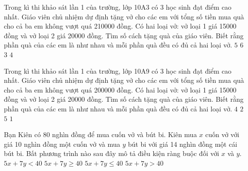 \begin{ex}
 Trong kì thi khảo sát lần 1 của trường, lớp 10A3 có 3 học sinh đạt điểm cao nhất. Giáo viên chủ nhiệm dự định tặng vở cho các em với tổng số tiền mua quà cho cả ba em không vượt quá 210000 đồng. Có hai loại vở: vở loại 1 giá 15000 đồng và vở loại 2 giá 20000 đồng. Tìm số cách tặng quà của giáo viên. Biết rằng phần quà của các em là như nhau và mỗi phần quà đều có đủ cả hai loại vở.
\choice
{\True ${5}$}
{${6}$}
{${3}$}
{${4}$}
\end{ex}

\begin{ex}
 Trong kì thi khảo sát lần 1 của trường, lớp 10A9 có 3 học sinh đạt điểm cao nhất. Giáo viên chủ nhiệm dự định tặng vở cho các em với tổng số tiền mua quà cho cả ba em không vượt quá 200000 đồng. Có hai loại vở: vở loại 1 giá 15000 đồng và vở loại 2 giá 20000 đồng. Tìm số cách tặng quà của giáo viên. Biết rằng phần quà của các em là như nhau và mỗi phần quà đều có đủ cả hai loại vở.
\choice
{\True ${4}$}
{${2}$}
{${5}$}
{${1}$}
\end{ex}

\begin{ex}
 Bạn Kiên có 80 nghìn đồng để mua cuốn vở và bút bi. Kiên mua ${x}$ cuốn vở với giá 10 nghìn đồng một cuốn vở và mua ${y}$ bút bi với giá 14 nghìn đồng một cái bút bi. Bất phương trình nào sau đây mô tả điều kiện ràng buộc đối với ${x}$ và ${y}$. 
\choice
{ $5 x + 7 y< 40$ }
   { $5 x + 7 y\ge 40$ }
     { \True $5 x + 7 y\le 40$ }
    { $5 x + 7 y> 40$ }
\end{ex}


